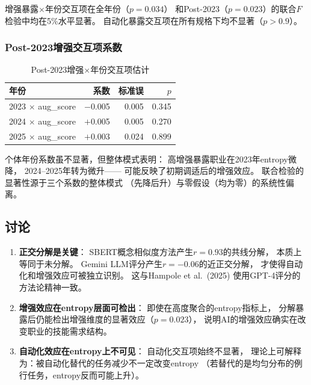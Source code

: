 \documentclass[12pt,a4paper]{ctexart}
\begin{document}
增强暴露$\times$年份交互项在全年份（$p=0.034$）
和Post-2023（$p=0.023$）的联合$F$检验中均在5\%水平显著。
自动化暴露交互项在所有规格下均不显著（$p>0.9$）。

\subsubsection{Post-2023增强交互项系数}

\begin{table}[h!]
\centering
\caption{Post-2023增强$\times$年份交互项估计}
\label{tab:gemini_post23}
\begin{tabular}{lrrr}
\toprule
年份 & 系数 & 标准误 & $p$ \\
\midrule
2023 $\times$ aug\_score & $-$0.005 & 0.005 & 0.345 \\
2024 $\times$ aug\_score & $+$0.005 & 0.005 & 0.270 \\
2025 $\times$ aug\_score & $+$0.003 & 0.024 & 0.899 \\
\bottomrule
\end{tabular}
\end{table}

个体年份系数虽不显著，但整体模式表明：
高增强暴露职业在2023年entropy微降，
2024--2025年转为微升——
可能反映了初期调适后的增强效应。
联合检验的显著性源于三个系数的整体模式
（先降后升）与零假设（均为零）的系统性偏离。

\subsection{讨论}

\begin{enumerate}
\item \textbf{正交分解是关键}：
      SBERT概念相似度方法产生$r=0.93$的共线分解，
      本质上等同于未分解。
      Gemini LLM评分产生$r=-0.06$的近正交分解，
      才使得自动化和增强效应可被独立识别。
      这与Hampole et al.\ (2025) 使用GPT-4评分的方法论精神一致。

\item \textbf{增强效应在entropy层面可检出}：
      即使在高度聚合的entropy指标上，
      分解暴露后仍能检出增强维度的显著效应（$p=0.023$），
      说明AI的增强效应确实在改变职业的技能需求结构。

\item \textbf{自动化效应在entropy上不可见}：
      自动化交互项始终不显著，
      理论上可解释为：被自动化替代的任务减少不一定改变entropy
      （若替代的是均匀分布的例行任务，entropy反而可能上升）。
\end{enumerate}
\end{document}
